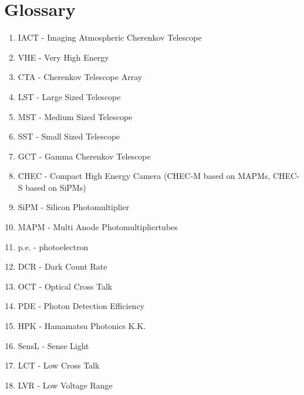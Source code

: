 \documentclass[12pt,article,type=msc,colorback,accentcolor=tud9c]{tudthesis}
\begin{document}
\newpage
\section{\Large Glossary}
\begin{enumerate}
\item IACT - Imaging Atmospheric Cherenkov Telescope
\item VHE - Very High Energy
\item CTA - Cherenkov Telescope Array
\item LST - Large Sized Telescope
\item MST - Medium Sized Telescope
\item SST - Small Sized Telescope
\item GCT - Gamma Cherenkov Telescope
\item CHEC - Compact High Energy Camera (CHEC-M based on MAPMs, CHEC-S based on SiPMs)
\item SiPM - Silicon Photomultiplier
\item MAPM - Multi Anode Photomultipliertubes
\item p.e. - photoelectron
\item DCR - Dark Count Rate
\item OCT - Optical Cross Talk
\item PDE - Photon Detection Efficiency
\item HPK - Hamamatsu Photonics K.K.
\item SensL - Sense Light
\item LCT - Low Cross Talk
\item LVR - Low Voltage Range
\end{enumerate}


\newpage
\end{document}
